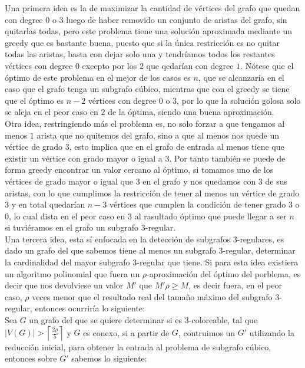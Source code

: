 \documentclass{article}
\begin{document}
Una primera idea es la de maximizar la cantidad de v\'ertices del grafo que quedan con degree $0$ o $3$ luego de haber 
removido un conjunto de aristas del grafo, sin quitarlas todas, pero este problema tiene una soluci\'on aproximada mediante un greedy 
que es bastante buena, puesto que si la \'unica restricci\'on es no quitar todas las aristas, basta con dejar solo una 
y tendr\'iamos todos los restantes v\'ertices con degree $0$ excepto por los $2$ que qedar\'ian con degree $1$. N\'otese que el 
\'optimo de este problema en el mejor de los casos es $n$, que se alcanzar\'ia en el caso que el grafo tenga un subgrafo c\'ubico, mientras 
que con el greedy se tiene que el \'optimo es $n-2$ v\'ertices con degree $0$ o  $3$, por lo que la soluci\'on golosa solo se aleja en el peor caso 
en $2$ de la \'optima, siendo una buena aproximaci\'on.\\ 

Otra idea, restringiendo m\'as el problema es, no solo forzar a que tengamos al menos $1$ arista que no quitemos del grafo, sino 
a que al menos nos quede un v\'ertice de grado $3$, esto implica que en el grafo de entrada al menos tiene que existir un v\'ertice con grado 
mayor o igual a $3$. Por tanto tambi\'en se puede de forma greedy encontrar un valor cercano al \'optimo, si tomamos uno de los v\'ertices de grado mayor  
o igual que $3$ en el grafo y nos quedamos con $3$ de sus aristas, con lo que cumplimos la restricci\'on de tener al menos un v\'ertice de grado $3$ y en total 
quedar\'ian $n-3$ v\'ertices que cumplen la condici\'on de tener grado $3$ o $0$, lo cual dista en el peor caso en $3$ al rasultado \'optimo que puede llegar a ser $n$
si tuvi\'eramos en el grafo un subgrafo $3$-regular.\\ 

Una tercera idea, esta s\'i enfocada en la detecci\'on de subgrafos $3$-regulares, es dado un grafo del que sabemos tiene al menos un subgrafo $3$-regular, determinar la cardinalidad del 
mayor subgrafo $3$-regular que tiene. Si para esta idea existiera un algoritmo polinomial que fuera un $\rho$-aproximaci\'on del \'optimo del porblema, es decir que nos devolviese un valor $M'$
que $M'\rho \geq M$, es decir fuera, en el peor caso, $\rho$ veces menor que el resultado real del tama\~no m\'aximo del subgrafo $3$-regular, entonces ocurrir\'ia lo siguiente: \\ 


Sea $G$ un grafo del que se quiere determinar si es $3$-coloreable, tal que $|V(G)| >  \left\lceil\frac{2\rho}{5} \right\rceil $ y $G$ es conexo, si a partir de $G$, contruimos un $G'$ utilizando la 
reducci\'on inicial, para obtener la entrada al problema de subgrafo c\'ubico, entonces sobre $G'$ sabemos lo siguiente: 
\end{document}
